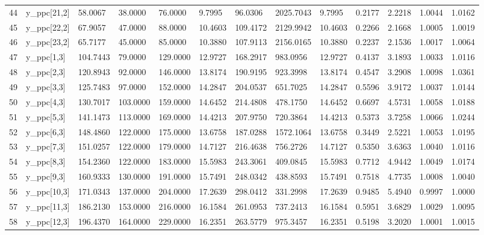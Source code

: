 \begin{table}[ht]
\begin{tabular}{rllllllllllll}
  44 & y\_ppc[21,2] &  58.0067 &  38.0000 &  76.0000 &  9.7995 &  96.0306 & 2025.7043 &  9.7995 & 0.2177 & 2.2218 & 1.0044 & 1.0162 \\ 
  45 & y\_ppc[22,2] &  67.9057 &  47.0000 &  88.0000 & 10.4603 & 109.4172 & 2129.9942 & 10.4603 & 0.2266 & 2.1668 & 1.0005 & 1.0019 \\ 
  46 & y\_ppc[23,2] &  65.7177 &  45.0000 &  85.0000 & 10.3880 & 107.9113 & 2156.0165 & 10.3880 & 0.2237 & 2.1536 & 1.0017 & 1.0064 \\ 
  47 & y\_ppc[1,3] & 104.7443 &  79.0000 & 129.0000 & 12.9727 & 168.2917 &  983.0956 & 12.9727 & 0.4137 & 3.1893 & 1.0033 & 1.0116 \\ 
  48 & y\_ppc[2,3] & 120.8943 &  92.0000 & 146.0000 & 13.8174 & 190.9195 &  923.3998 & 13.8174 & 0.4547 & 3.2908 & 1.0098 & 1.0361 \\ 
  49 & y\_ppc[3,3] & 125.7483 &  97.0000 & 152.0000 & 14.2847 & 204.0537 &  651.7025 & 14.2847 & 0.5596 & 3.9172 & 1.0037 & 1.0144 \\ 
  50 & y\_ppc[4,3] & 130.7017 & 103.0000 & 159.0000 & 14.6452 & 214.4808 &  478.1750 & 14.6452 & 0.6697 & 4.5731 & 1.0058 & 1.0188 \\ 
  51 & y\_ppc[5,3] & 141.1473 & 113.0000 & 169.0000 & 14.4213 & 207.9750 &  720.3864 & 14.4213 & 0.5373 & 3.7258 & 1.0066 & 1.0244 \\ 
  52 & y\_ppc[6,3] & 148.4860 & 122.0000 & 175.0000 & 13.6758 & 187.0288 & 1572.1064 & 13.6758 & 0.3449 & 2.5221 & 1.0053 & 1.0195 \\ 
  53 & y\_ppc[7,3] & 151.0257 & 122.0000 & 179.0000 & 14.7127 & 216.4638 &  756.2726 & 14.7127 & 0.5350 & 3.6363 & 1.0040 & 1.0116 \\ 
  54 & y\_ppc[8,3] & 154.2360 & 122.0000 & 183.0000 & 15.5983 & 243.3061 &  409.0845 & 15.5983 & 0.7712 & 4.9442 & 1.0049 & 1.0174 \\ 
  55 & y\_ppc[9,3] & 160.9333 & 130.0000 & 191.0000 & 15.7491 & 248.0342 &  438.8593 & 15.7491 & 0.7518 & 4.7735 & 1.0008 & 1.0040 \\ 
  56 & y\_ppc[10,3] & 171.0343 & 137.0000 & 204.0000 & 17.2639 & 298.0412 &  331.2998 & 17.2639 & 0.9485 & 5.4940 & 0.9997 & 1.0000 \\ 
  57 & y\_ppc[11,3] & 186.2130 & 153.0000 & 216.0000 & 16.1584 & 261.0953 &  737.2413 & 16.1584 & 0.5951 & 3.6829 & 1.0029 & 1.0095 \\ 
  58 & y\_ppc[12,3] & 196.4370 & 164.0000 & 229.0000 & 16.2351 & 263.5779 &  975.3457 & 16.2351 & 0.5198 & 3.2020 & 1.0001 & 1.0015 \\ 

\end{tabular}
\end{table}

